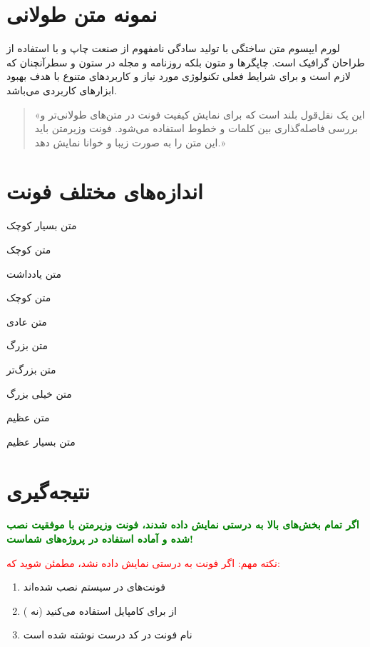 \documentclass[12pt,a4paper]{article}
\begin{document}
\section{نمونه متن طولانی}
لورم ایپسوم متن ساختگی با تولید سادگی نامفهوم از صنعت چاپ و با استفاده از طراحان گرافیک است. چاپگرها و متون بلکه روزنامه و مجله در ستون و سطرآنچنان که لازم است و برای شرایط فعلی تکنولوژی مورد نیاز و کاربردهای متنوع با هدف بهبود ابزارهای کاربردی می‌باشد.

\begin{quote}
«این یک نقل‌قول بلند است که برای نمایش کیفیت فونت در متن‌های طولانی‌تر و بررسی فاصله‌گذاری بین کلمات و خطوط استفاده می‌شود. فونت وزیرمتن باید این متن را به صورت زیبا و خوانا نمایش دهد.»
\end{quote}

\section{اندازه‌های مختلف فونت}

{\tiny متن بسیار کوچک}

{\scriptsize متن کوچک}

{\footnotesize متن یادداشت}

{\small متن کوچک}

{\normalsize متن عادی}

{\large متن بزرگ}

{\Large متن بزرگ‌تر}

{\LARGE متن خیلی بزرگ}

{\huge متن عظیم}

{\Huge متن بسیار عظیم}

\section{نتیجه‌گیری}
\textcolor{green}{\textbf{اگر تمام بخش‌های بالا به درستی نمایش داده شدند، فونت وزیرمتن با موفقیت نصب شده و آماده استفاده در پروژه‌های  شماست!}}

\vspace{1cm}

\textcolor{red}{نکته مهم: اگر فونت به درستی نمایش داده نشد، مطمئن شوید که:}
\begin{enumerate}
\item فونت‌های  در سیستم نصب شده‌اند
\item از  برای کامپایل استفاده می‌کنید (نه )
\item نام فونت در کد درست نوشته شده است
\end{enumerate}
\end{document}
